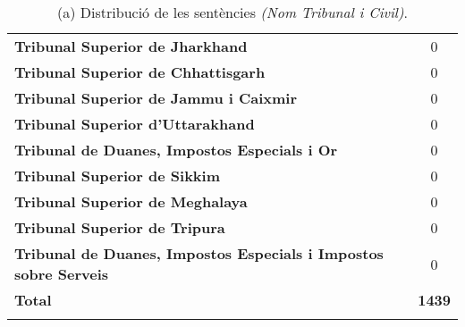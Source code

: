 \begin{table}[H]
\begin{tabular}{|l|c}
    \textbf{Tribunal Superior de Jharkhand} & 0 \\
    \textbf{Tribunal Superior de Chhattisgarh} & 0 \\
    \textbf{Tribunal Superior de Jammu i Caixmir} & 0 \\
    \textbf{Tribunal Superior d'Uttarakhand} & 0 \\
    \textbf{Tribunal de Duanes, Impostos Especials i Or} & 0 \\
    \textbf{Tribunal Superior de Sikkim} & 0 \\
    \textbf{Tribunal Superior de Meghalaya} & 0 \\
    \textbf{Tribunal Superior de Tripura} & 0 \\
    \textbf{Tribunal de Duanes, Impostos Especials i Impostos sobre Serveis} & 0 \\
    \hline
    \textbf{Total} & \textbf{1439} \\
    \Xhline{2\arrayrulewidth}
   \end{tabular}
   \captionsetup{font=small}
   \caption*{(a) Distribució de les sentències \textit{(Nom Tribunal i Civil)}.}
\end{table}

\pagebreak
  
